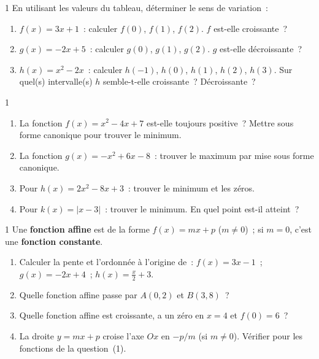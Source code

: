 \begin{exo}{1}
En utilisant les valeurs du tableau, d\'eterminer le sens de variation~:
\begin{enumerate}
  \item $f(x)=3x+1$~: calculer $f(0)$, $f(1)$, $f(2)$. $f$ est-elle croissante~?
  \item $g(x)=-2x+5$~: calculer $g(0)$, $g(1)$, $g(2)$.
        $g$ est-elle d\'ecroissante~?
  \item $h(x)=x^2-2x$~: calculer $h(-1)$, $h(0)$, $h(1)$, $h(2)$, $h(3)$.
        Sur quel(s) intervalle(s) $h$ semble-t-elle croissante~? D\'ecroissante~?
\end{enumerate}
\end{exo}

\begin{exo}{1}
\begin{enumerate}
  \item La fonction $f(x)=x^2-4x+7$ est-elle toujours positive~?
        Mettre sous forme canonique pour trouver le minimum.
  \item La fonction $g(x)=-x^2+6x-8$~: trouver le maximum par
        mise sous forme canonique.
  \item Pour $h(x)=2x^2-8x+3$~: trouver le minimum et les z\'eros.
  \item Pour $k(x)=|x-3|$~: trouver le minimum. En quel point est-il atteint~?
\end{enumerate}
\end{exo}

\begin{exo}{1}
Une \textbf{fonction affine} est de la forme $f(x)=mx+p$ ($m\ne0$)~;
si $m=0$, c'est une \textbf{fonction constante}.
\begin{enumerate}
  \item Calculer la pente et l'ordonn\'ee \`a l'origine de~:
        $f(x)=3x-1$~; $g(x)=-2x+4$~; $h(x)=\frac{x}{2}+3$.
  \item Quelle fonction affine passe par $A(0,2)$ et $B(3,8)$~?
  \item Quelle fonction affine est croissante, a un z\'ero en $x=4$
        et $f(0)=6$~?
  \item La droite $y=mx+p$ croise l'axe $Ox$ en $-p/m$ (si $m\ne0$).
        V\'erifier pour les fonctions de la question~(1).
\end{enumerate}
\end{exo}


